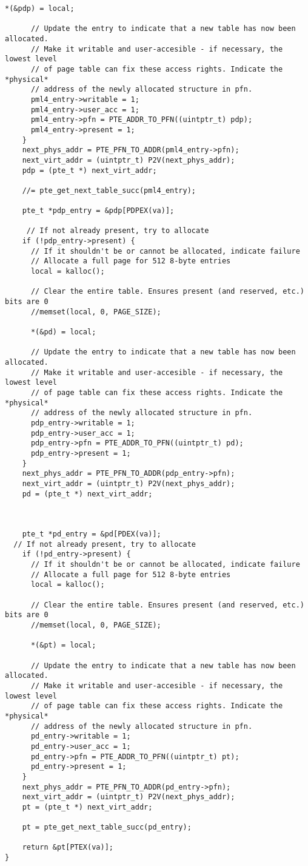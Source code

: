 \begin{lstlisting}[style=CStyle]
      *(&pdp) = local;

      // Update the entry to indicate that a new table has now been allocated.
      // Make it writable and user-accesible - if necessary, the lowest level
      // of page table can fix these access rights. Indicate the *physical*
      // address of the newly allocated structure in pfn.
      pml4_entry->writable = 1;
      pml4_entry->user_acc = 1;
      pml4_entry->pfn = PTE_ADDR_TO_PFN((uintptr_t) pdp);
      pml4_entry->present = 1;
    }
    next_phys_addr = PTE_PFN_TO_ADDR(pml4_entry->pfn);
    next_virt_addr = (uintptr_t) P2V(next_phys_addr);
    pdp = (pte_t *) next_virt_addr;

    //= pte_get_next_table_succ(pml4_entry);

    pte_t *pdp_entry = &pdp[PDPEX(va)];

     // If not already present, try to allocate
    if (!pdp_entry->present) {
      // If it shouldn't be or cannot be allocated, indicate failure
      // Allocate a full page for 512 8-byte entries
      local = kalloc();
   
      // Clear the entire table. Ensures present (and reserved, etc.) bits are 0
      //memset(local, 0, PAGE_SIZE);
      
      *(&pd) = local;

      // Update the entry to indicate that a new table has now been allocated.
      // Make it writable and user-accesible - if necessary, the lowest level
      // of page table can fix these access rights. Indicate the *physical*
      // address of the newly allocated structure in pfn.
      pdp_entry->writable = 1;
      pdp_entry->user_acc = 1;
      pdp_entry->pfn = PTE_ADDR_TO_PFN((uintptr_t) pd);
      pdp_entry->present = 1;
    }
    next_phys_addr = PTE_PFN_TO_ADDR(pdp_entry->pfn);
    next_virt_addr = (uintptr_t) P2V(next_phys_addr);
    pd = (pte_t *) next_virt_addr;
    
   

    pte_t *pd_entry = &pd[PDEX(va)];
  // If not already present, try to allocate
    if (!pd_entry->present) {
      // If it shouldn't be or cannot be allocated, indicate failure
      // Allocate a full page for 512 8-byte entries
      local = kalloc();
   
      // Clear the entire table. Ensures present (and reserved, etc.) bits are 0
      //memset(local, 0, PAGE_SIZE);
      
      *(&pt) = local;

      // Update the entry to indicate that a new table has now been allocated.
      // Make it writable and user-accesible - if necessary, the lowest level
      // of page table can fix these access rights. Indicate the *physical*
      // address of the newly allocated structure in pfn.
      pd_entry->writable = 1;
      pd_entry->user_acc = 1;
      pd_entry->pfn = PTE_ADDR_TO_PFN((uintptr_t) pt);
      pd_entry->present = 1;
    }
    next_phys_addr = PTE_PFN_TO_ADDR(pd_entry->pfn);
    next_virt_addr = (uintptr_t) P2V(next_phys_addr);
    pt = (pte_t *) next_virt_addr;
    
    pt = pte_get_next_table_succ(pd_entry);

    return &pt[PTEX(va)];
}
\end{lstlisting}

